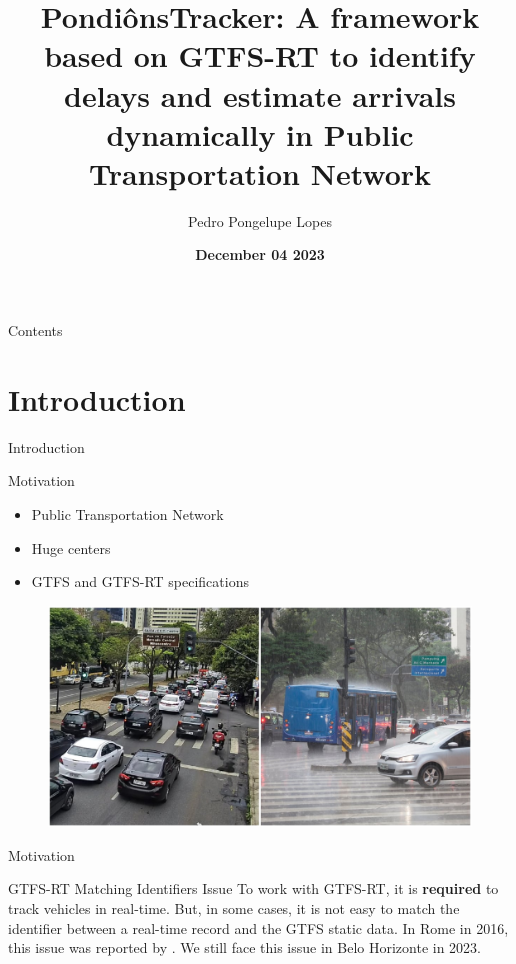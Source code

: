 \documentclass[xcolor=dvipsnames,table]{beamer}
\title{PondiônsTracker: A framework based on GTFS-RT to identify delays and estimate arrivals dynamically in Public Transportation Network}
\author{
        Pedro Pongelupe Lopes
}
\institute{Programa de Pós-Graduação em Informática}
\date{\textbf{December 04 2023} }
\begin{document}
\begin{frame}
        \titlepage
\end{frame}

\begin{frame}{Contents}%
        \tableofcontents[ hideothersubsections]
\end{frame}


\section{Introduction}
\begin{frame}{Introduction}
        \begin{block}{Motivation}
                \begin{itemize}
                        \item Public Transportation Network
                        \item Huge centers 
                        \item GTFS and GTFS-RT specifications
                \end{itemize}
        \end{block}
                \begin{figure}[H]
                        \centering
                        \includegraphics[scale=0.15]{images/chuva-engarrafamento.jpg}
                \end{figure}
\end{frame}

\begin{frame}{Motivation}
        \begin{block}{GTFS-RT Matching Identifiers Issue}
                To work with GTFS-RT, it is \textbf{required} to track vehicles in real-time. But, in some cases, it is not easy to match the identifier between a real-time record and the GTFS static data. In Rome in 2016, this issue was reported by \cite{bigdata}. We still face this issue in Belo Horizonte in 2023.
        \end{block}
\end{frame}
\end{document}
